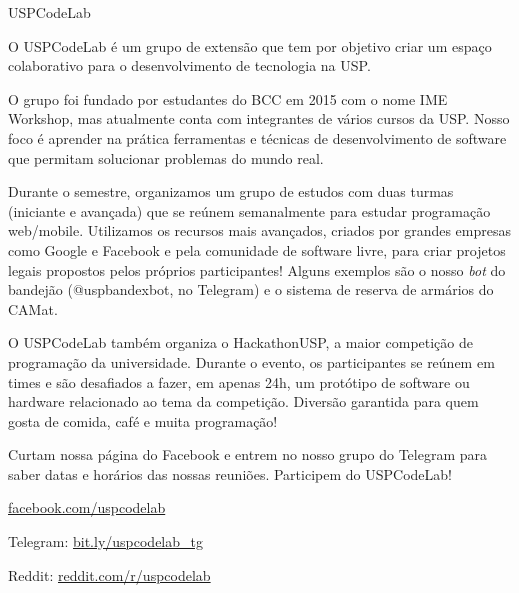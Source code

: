 \begin{subsecao}{USPCodeLab}


O USPCodeLab é um grupo de extensão que tem por objetivo criar um espaço
colaborativo para o desenvolvimento de tecnologia na USP.

O grupo foi fundado por estudantes do BCC em 2015 com o nome IME Workshop, mas
atualmente conta com integrantes de vários cursos da USP. Nosso foco é aprender
na prática ferramentas e técnicas de desenvolvimento de software que permitam
solucionar problemas do mundo real.

Durante o semestre, organizamos um grupo de estudos com duas turmas (iniciante
e avançada) que se reúnem semanalmente para estudar programação web/mobile.
Utilizamos os recursos mais avançados, criados por grandes empresas como Google
e Facebook e pela comunidade de software livre, para criar projetos legais
propostos pelos próprios participantes! Alguns exemplos são o nosso \textit{bot}
do bandejão (@uspbandexbot, no Telegram) e o sistema de reserva de armários do
CAMat.

O USPCodeLab também organiza o HackathonUSP, a maior competição de programação
da universidade. Durante o evento, os participantes se reúnem em times e são
desafiados a fazer, em apenas 24h, um protótipo de software ou hardware
relacionado ao tema da competição. Diversão garantida para quem gosta de comida,
café e muita programação!

Curtam nossa página do Facebook e entrem no nosso grupo do Telegram para saber
datas e horários das nossas reuniões. Participem do USPCodeLab!

\begin{center}
  \Large
  \url{facebook.com/uspcodelab}

  Telegram: \url{bit.ly/uspcodelab_tg}

  Reddit: \url{reddit.com/r/uspcodelab}
\end{center}

\end{subsecao}
